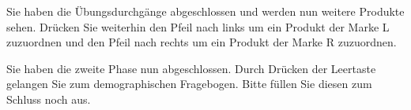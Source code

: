 \documentclass[a4paper,man,natbib]{apa6}
\begin{document}
\vspace{\baselineskip}

Sie haben die Übungsdurchgänge abgeschlossen und werden nun weitere Produkte sehen.
Drücken Sie weiterhin den Pfeil nach links um ein Produkt der Marke L zuzuordnen und den Pfeil nach rechts um ein Produkt der Marke R zuzuordnen.

\vspace{\baselineskip}

Sie haben die zweite Phase nun abgeschlossen.
Durch Drücken der Leertaste gelangen Sie zum demographischen Fragebogen.
Bitte füllen Sie diesen zum Schluss noch aus.
\end{document}
